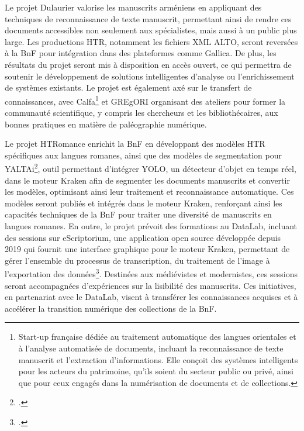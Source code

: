 \documentclass[a4paper,12pt,twoside]{book}
\begin{document}
	Le projet Dulaurier valorise les manuscrits arméniens en appliquant des techniques de reconnaissance de texte manuscrit, permettant ainsi de rendre ces documents accessibles non seulement aux spécialistes, mais aussi à un public plus large. Les productions HTR, notamment les fichiers XML ALTO, seront reversées à la BnF pour intégration dans des plateformes comme Gallica. De plus, les résultats du projet seront mis à disposition en accès ouvert, ce qui permettra de soutenir le développement de solutions intelligentes d’analyse ou l’enrichissement de systèmes existants. Le projet est également axé sur le transfert de connaissances, avec Calfa\footnote{  Start-up française dédiée au traitement automatique des langues orientales et à l’analyse automatisée de documents, incluant la reconnaissance de texte manuscrit et l’extraction d’informations. Elle conçoit des systèmes intelligents pour les acteurs du patrimoine, qu’ils soient du secteur public ou privé, ainsi que pour ceux engagés dans la numérisation de documents et de collections.} et GREgORI organisant des ateliers pour former la communauté scientifique, y compris les chercheurs et les bibliothécaires, aux bonnes pratiques en matière de paléographie numérique.
	
	Le projet HTRomance enrichit la BnF en développant des modèles HTR spécifiques aux langues romanes, ainsi que des modèles de segmentation pour YALTAi\footcite{clerice_you_2023}, outil permettant d’intégrer YOLO, un détecteur d’objet en temps réel, dans le moteur Kraken afin de segmenter les documents manuscrits et convertir les modèles, optimisant ainsi leur traitement et reconnaissance automatique. Ces modèles seront publiés et intégrés dans le moteur Kraken, renforçant ainsi les capacités techniques de la BnF pour traiter une diversité de manuscrits en langues romanes. En outre, le projet prévoit des formations au DataLab, incluant des sessions sur eScriptorium, une application open source développée depuis 2019 qui fournit une interface graphique pour le moteur Kraken, permettant de gérer l’ensemble du processus de transcription, du traitement de l’image à l’exportation des données\footcite{chague_escriptorium_2022}. Destinées aux médiévistes et modernistes, ces sessions seront accompagnées d’expériences sur la lisibilité des manuscrits. Ces initiatives, en partenariat avec le DataLab, visent à transférer les connaissances acquises et à accélérer la transition numérique des collections de la BnF.
	\\
	
\end{document}
